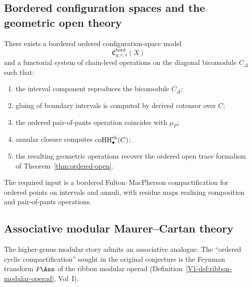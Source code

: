 \subsection{Bordered configuration spaces and the geometric open theory}

\begin{conjecture}
\label{conj:bordered}
There exists a bordered ordered configuration-space model
\[
\mathfrak C^{\mathrm{bord}}_{g,r,s}(X)
\]
and a functorial system of chain-level operations on the diagonal bicomodule $C_\Delta$ such that:
\begin{enumerate}[label=(\arabic*)]
\item the interval component reproduces the bicomodule $C_\Delta$;
\item gluing of boundary intervals is computed by derived cotensor over $C$;
\item the ordered pair-of-pants operation coincides with $\mu_P$;
\item annular closure computes $\operatorname{coHH}^{\mathrm{ch}}_\bullet(C)$;
\item the resulting geometric operations recover the ordered open trace formalism of
Theorem~\ref{thm:ordered-open}.
\end{enumerate}
\end{conjecture}

\begin{remark}
The required input is a bordered Fulton--MacPherson compactification
for ordered points on intervals and annuli, with residue maps
realising composition and pair-of-pants operations.
\end{remark}

\subsection{Associative modular Maurer--Cartan theory}

The higher-genus modular story admits an associative analogue.
The ``ordered cyclic compactification'' sought in the original
conjecture is the Feynman transform $F\!\Ass$ of the ribbon modular
operad (Definition~\ref*{V1-def:ribbon-modular-operad}, Vol~I).

